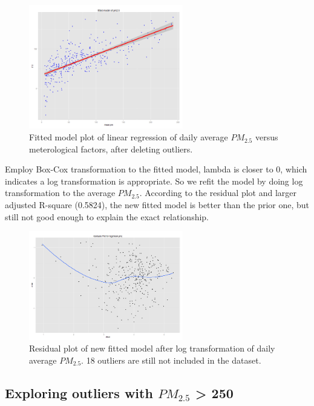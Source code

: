 \documentclass[11pt]{article} %
\begin{document}
 \begin{figure}[!ht]
  \centering
    \includegraphics[width=0.6\textwidth]{Figure2-3}
      \caption{Fitted model plot of linear regression of daily average \(PM_{2.5}\) versus
      meterological factors, after deleting outliers.}
\end{figure}

Employ Box-Cox transformation to the fitted model, lambda is closer to 0, which indicates a log transformation is appropriate. So we refit the model by doing log transformation to the average \(PM_{2.5}\). According to the residual plot and larger adjusted R-square (0.5824), the new fitted model is better than the prior one, but still not good enough to explain the exact relationship.

 \begin{figure}[!ht]
  \centering
    \includegraphics[width=0.6\textwidth]{Figure2-4}
      \caption{Residual plot of new fitted model after log transformation of daily average \(PM_{2.5}\). 18 outliers are still not included in the dataset.}
\end{figure}

\newpage

\subsection{Exploring outliers with \(PM_{2.5}\) > 250}
\end{document}
